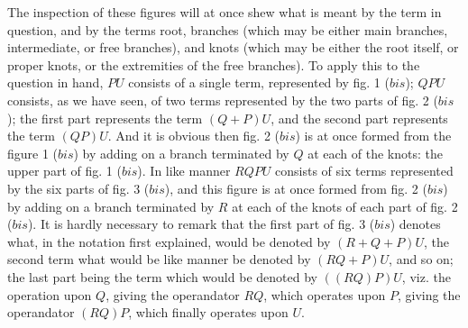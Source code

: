 \documentclass[11pt,a4paper]{book}
\begin{document}
\medskip

The inspection of these figures will at once shew what is meant by the term in
question, and by the terms root, branches (which may be either main branches, intermediate,
or free branches), and knots (which may be either the root itself,
or proper knots, or the extremities of the free branches). To apply this to the
question in hand, $PU$ consists of a single term, represented by fig. 1 ($bis$); $QPU$
consists, as we have seen, of two terms represented by the two parts of fig. 2 ($bis$); the
first part represents the term $(Q + P)U$, and the second part represents the term
$(QP)U$. And it is obvious then fig. 2 ($bis$) is at once formed from the figure 1
($bis$) by adding on a branch terminated by $Q$ at each of the knots: the upper part
of fig. 1 ($bis$). In like manner $RQPU$ consists of six terms represented by the six
parts of fig. 3 ($bis$), and this figure is at once formed from fig. 2 ($bis$) by adding
on a branch terminated by $R$ at each of the knots of each part of fig. 2 ($bis$). It is
hardly necessary to remark that the first part of fig. 3 ($bis$) denotes what, in the
notation first explained, would be denoted by $(R + Q + P)U$, the second term what
would be like manner be denoted by $(RQ + P)U$, and so on; the last part being the
term which would be denoted by $((RQ)P)U$, viz. the operation upon $Q$, giving the
operandator $RQ$, which operates upon $P$, giving the operandator $(RQ)P$, which finally
operates upon $U$.

\medskip
\end{document}
